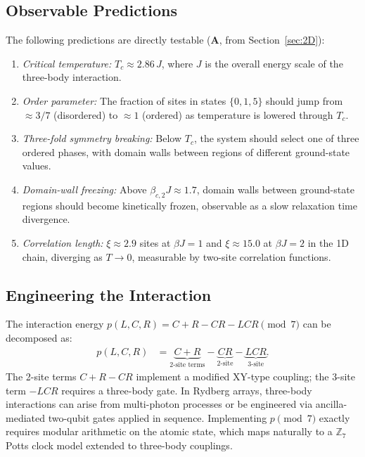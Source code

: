 \documentclass[11pt]{article}
\theoremstyle{remark}
\newcommand{\CatA}{\textbf{A}}
\begin{document}
\subsection{Observable Predictions}

The following predictions are directly testable (\CatA{}, from Section~\ref{sec:2D}):
\begin{enumerate}[leftmargin=2em,itemsep=2pt]
  \item \emph{Critical temperature:} $T_c \approx 2.86\,J$, where $J$ is the
    overall energy scale of the three-body interaction.
  \item \emph{Order parameter:} The fraction of sites in states $\{0,1,5\}$ should
    jump from $\approx 3/7$ (disordered) to $\approx 1$ (ordered) as temperature
    is lowered through $T_c$.
  \item \emph{Three-fold symmetry breaking:} Below $T_c$, the system should
    select one of three ordered phases, with domain walls between regions of
    different ground-state values.
  \item \emph{Domain-wall freezing:} Above $\beta_{c,2} J \approx 1.7$, domain
    walls between ground-state regions should become kinetically frozen, observable
    as a slow relaxation time divergence.
  \item \emph{Correlation length:} $\xi \approx 2.9$ sites at $\beta J = 1$ and
    $\xi \approx 15.0$ at $\beta J = 2$ in the 1D chain, diverging as
    $T \to 0$, measurable by two-site correlation functions.
\end{enumerate}

\subsection{Engineering the Interaction}

The interaction energy $p(L,C,R) = C + R - CR - LCR \pmod 7$ can be decomposed as:
\begin{align*}
  p(L,C,R) &= \underbrace{C + R}_{\text{2-site terms}} - \underbrace{CR}_{\text{2-site}} - \underbrace{LCR}_{\text{3-site}}.
\end{align*}
The 2-site terms $C + R - CR$ implement a modified XY-type coupling; the 3-site
term $-LCR$ requires a three-body gate. In Rydberg arrays, three-body interactions
can arise from multi-photon processes or be engineered via ancilla-mediated
two-qubit gates applied in sequence. Implementing $p \pmod 7$ exactly requires
modular arithmetic on the atomic state, which maps naturally to a $\mathbb{Z}_7$
Potts clock model extended to three-body couplings.
\end{document}

